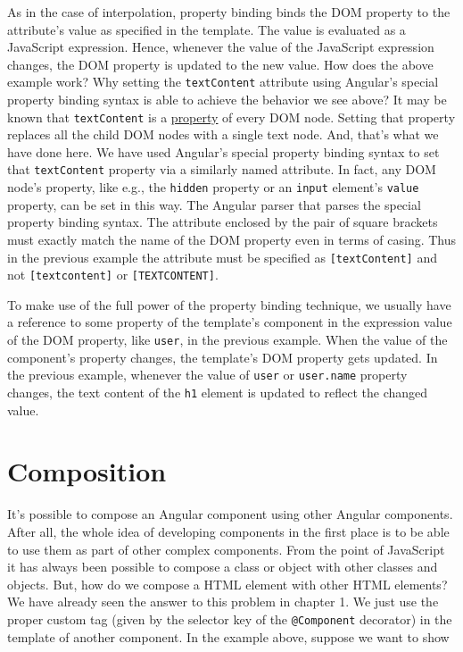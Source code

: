 \documentclass{report}
\begin{document}
As in the case of interpolation, property binding binds the DOM property to the attribute's value as specified in the template. The value is evaluated as a JavaScript expression. Hence, whenever the value of the JavaScript expression changes, the DOM property is updated to the new value. How does the above example work? Why setting the \verb|textContent| attribute using Angular's special property binding syntax is able to achieve the behavior we see above? It may be known that \verb|textContent| is a \href{https://developer.mozilla.org/en-US/docs/Web/API/Node/textContent}{property} of every DOM node. Setting that property replaces all the child DOM nodes with a single text node. And, that's what we have done here. We have used Angular's special property binding syntax to set that  \verb|textContent| property via a similarly named attribute. In fact, any DOM node's property, like e.g., the \verb|hidden| property or an \verb|input| element's \verb|value| property, can be set in this way. The Angular parser that parses the special property binding syntax. The attribute enclosed by the pair of square brackets must exactly match the name of the DOM property even in terms of casing. Thus in the previous example the attribute must be specified as \verb|[textContent]| and not \verb|[textcontent]| or \verb|[TEXTCONTENT]|.

To make use of the full power of the property binding technique, we usually have a reference to some property of the template's component in the expression value of the DOM property, like \verb|user|, in the previous example. When the value of the component's property changes, the template's DOM property gets updated. In the previous example, whenever the value of \verb|user| or \verb|user.name| property changes, the text content of the \verb|h1| element is updated to reflect the changed value.

\section{Composition}
It's possible to compose an Angular component using other Angular components. After all, the whole idea of developing components in the first place is to be able to use them as part of other complex components. From the point of JavaScript it has always been possible to compose a class or object with other classes and objects. But, how do we compose a HTML element with other HTML elements? We have already seen the answer to this problem in chapter 1. We just use the proper custom tag (given by the selector key of the \verb|@Component| decorator) in the template of another component. In the example above, suppose we want to show
\end{document}
